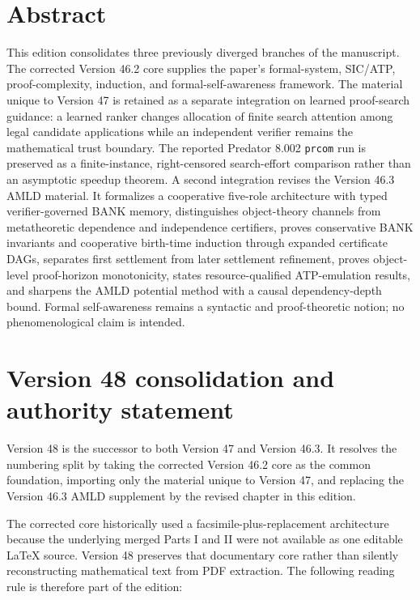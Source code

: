 \documentclass[11pt]{article}
\theoremstyle{remark}
\begin{document}
\section*{Abstract}
This edition consolidates three previously diverged branches of the manuscript. The corrected Version 46.2 core supplies the paper's formal-system, SIC/ATP, proof-complexity, induction, and formal-self-awareness framework. The material unique to Version 47 is retained as a separate integration on learned proof-search guidance: a learned ranker changes allocation of finite search attention among legal candidate applications while an independent verifier remains the mathematical trust boundary. The reported Predator 8.002 \texttt{prcom} run is preserved as a finite-instance, right-censored search-effort comparison rather than an asymptotic speedup theorem. A second integration revises the Version 46.3 AMLD material. It formalizes a cooperative five-role architecture with typed verifier-governed BANK memory, distinguishes object-theory channels from metatheoretic dependence and independence certifiers, proves conservative BANK invariants and cooperative birth-time induction through expanded certificate DAGs, separates first settlement from later settlement refinement, proves object-level proof-horizon monotonicity, states resource-qualified ATP-emulation results, and sharpens the AMLD potential method with a causal dependency-depth bound. Formal self-awareness remains a syntactic and proof-theoretic notion; no phenomenological claim is intended.

\section*{Version 48 consolidation and authority statement}
Version 48 is the successor to both Version 47 and Version 46.3. It resolves the numbering split by taking the corrected Version 46.2 core as the common foundation, importing only the material unique to Version 47, and replacing the Version 46.3 AMLD supplement by the revised chapter in this edition.

The corrected core historically used a facsimile-plus-replacement architecture because the underlying merged Parts I and II were not available as one editable LaTeX source. Version 48 preserves that documentary core rather than silently reconstructing mathematical text from PDF extraction. The following reading rule is therefore part of the edition:
\end{document}
